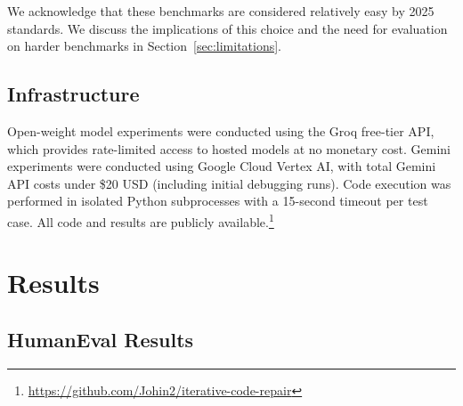 \documentclass[conference]{IEEEtran}
\begin{document}
We acknowledge that these benchmarks are considered relatively easy by 2025 standards. We discuss the implications of this choice and the need for evaluation on harder benchmarks in Section~\ref{sec:limitations}.

\subsection{Infrastructure}

Open-weight model experiments were conducted using the Groq free-tier API, which provides rate-limited access to hosted models at no monetary cost. Gemini experiments were conducted using Google Cloud Vertex AI, with total Gemini API costs under \$20 USD (including initial debugging runs). Code execution was performed in isolated Python subprocesses with a 15-second timeout per test case. All code and results are publicly available.\footnote{\url{https://github.com/Johin2/iterative-code-repair}}

\section{Results}
\label{sec:results}

\subsection{HumanEval Results}

\begin{table}[t]
\centering
\caption{Cumulative pass@1 (\%) on HumanEval (164 problems) by repair round. $R_0$ is the initial attempt; $R_1$--$R_4$ are repair rounds. $\Delta$ denotes the total self-repair gain ($R_4 - R_0$) in percentage points.}
\label{tab:humaneval}
\end{table}
\end{document}
